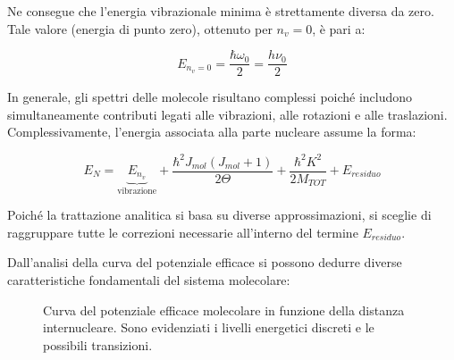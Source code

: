 Ne consegue che l'energia vibrazionale minima è strettamente diversa da zero. Tale valore (energia di punto zero), ottenuto per \( n_v = 0 \), è pari a:

\begin{equation}
    E_{n_v=0} = \frac{\hbar\omega_0}{2} = \frac{h\nu_0}{2}
\end{equation}

In generale, gli spettri delle molecole risultano complessi poiché includono simultaneamente contributi legati alle vibrazioni, alle rotazioni e alle traslazioni. 
Complessivamente, l'energia associata alla parte nucleare assume la forma:

\begin{equation}
    E_N = \underbrace{E_{n_v}}_{\text{vibrazione}} + \frac{\hbar^2 J_{mol}(J_{mol}+1)}{2\Theta} + \frac{\hbar^2 K^2}{2M_{TOT}} + E_{residuo}
\end{equation}

Poiché la trattazione analitica si basa su diverse approssimazioni, si sceglie di raggruppare tutte le correzioni necessarie all'interno del termine \( E_{residuo} \).

Dall'analisi della curva del potenziale efficace si possono dedurre diverse caratteristiche fondamentali del sistema molecolare:

\begin{figure}[htbp]
    \centering
    \caption{Curva del potenziale efficace molecolare in funzione della distanza internucleare. Sono evidenziati i livelli energetici discreti e le possibili transizioni.}
    \label{fig:potenziale_efficace_molecolare}
\end{figure}

